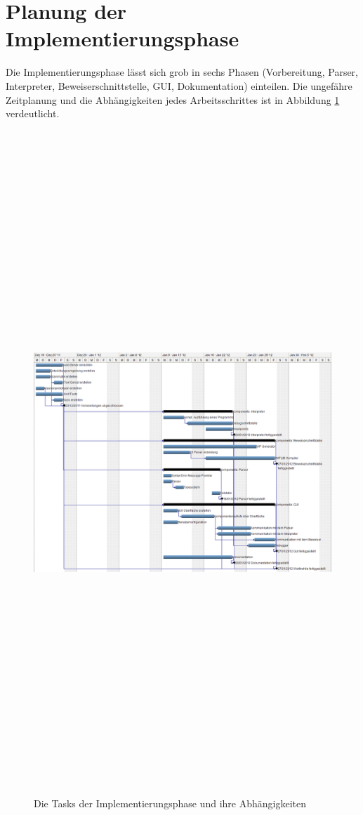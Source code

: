 \section{Planung der Implementierungsphase}

Die Implementierungsphase lässt sich grob in sechs Phasen (Vorbereitung, Parser, Interpreter, Beweiserschnittstelle, GUI, Dokumentation) einteilen. Die ungefähre Zeitplanung und die Abhängigkeiten jedes Arbeitsschrittes ist in Abbildung \ref{gantt_impl} verdeutlicht.

\begin{figure}
	\centering
	\hspace*{-2cm}\vspace*{-2cm}\caption[B]{Die Tasks der Implementierungsphase und ihre Abhängigkeiten}
	\hspace*{-3cm}\vspace*{-3cm}\includegraphics[angle=90,width=19cm,height= 25cm]{../implementierung/gantt_implementierung_diag.png}
	
	\label{gantt_impl}
\end{figure}


